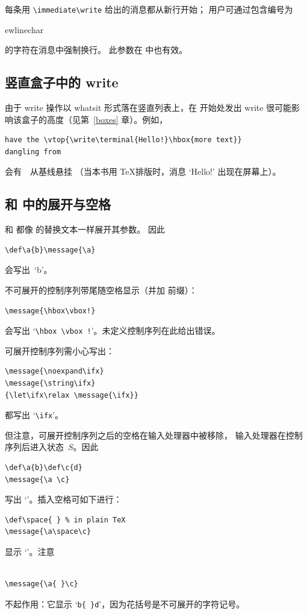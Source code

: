 \documentclass[a4paper]{rapport3}
\makeatletter
\def\cstoidx#1\par{\index{#1@\cs{#1}}}
\def\csidx#1{\cstoidx #1\par\cs{#1}}
\makeatother
\begin{document}
每条用 \verb=\immediate\write= 给出的消息都从新行开始；
用户可通过包含编号为 \csidx{newlinechar} 的字符在消息中强制换行。
此参数在  中也有效。

\subsection{竖直盒子中的 write}

由于 write 操作以 whatsit 形式落在竖直列表上，在  开始处发出 write
很可能影响该盒子的高度（见第~\ref{boxes} 章）。例如，
\begin{verbatim}
have the \vtop{\write\terminal{Hello!}\hbox{more text}}
dangling from
\end{verbatim}
会有~~从基线悬挂
（当本书用 \TeX 排版时，消息 `Hello!' 出现在屏幕上）。

\subsection{ 和  中的展开与空格}

 和  都像  的替换文本一样展开其参数。
因此 \begin{verbatim}
\def\a{b}\message{\a}
\end{verbatim}
会写出~`\n b'。

不可展开的控制序列带尾随空格显示（并加  前缀）：
\begin{verbatim}
\message{\hbox\vbox!}
\end{verbatim}
会写出 `\verb>\hbox \vbox !>'。未定义控制序列在此给出错误。

可展开控制序列需小心写出：
\begin{verbatim}
\message{\noexpand\ifx}
\message{\string\ifx}
{\let\ifx\relax \message{\ifx}}
\end{verbatim}
都写出 `\verb>\ifx>'。

但注意，可展开控制序列之后的空格在输入处理器中被移除，
输入处理器在控制序列后进入状态~$S$。因此
\begin{verbatim}
\def\a{b}\def\c{d}
\message{\a \c}
\end{verbatim}
写出 `'。插入空格可如下进行：
\begin{verbatim}
\def\space{ } % in plain TeX
\message{\a\space\c}
\end{verbatim}
显示 `'。注意\begin{verbatim}
 
\message{\a{ }\c}
\end{verbatim}
不起作用：它显示 `\verb=b{ }d='，因为花括号是不可展开的字符记号。
\end{document}

